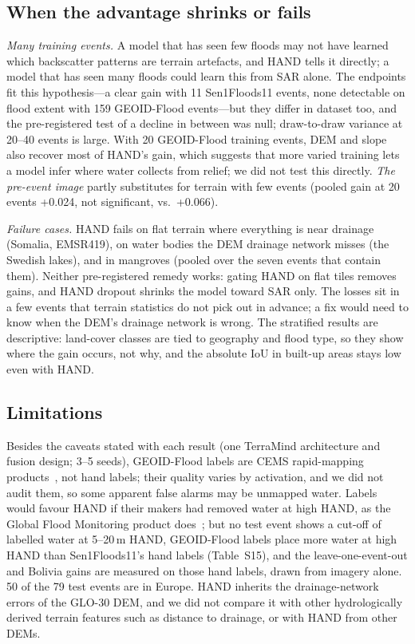 \subsection{When the advantage shrinks or fails}
\emph{Many training events.} A model that has seen few floods may not have learned which backscatter
patterns are terrain artefacts, and HAND tells it directly; a model that has seen many floods could learn
this from SAR alone. The endpoints fit this hypothesis---a clear gain with 11 Sen1Floods11 events, none
detectable on flood extent with 159 GEOID-Flood events---but they differ in dataset too, and the
pre-registered test of a decline in between was null; draw-to-draw variance at 20--40 events is large. With
20 GEOID-Flood training events, DEM and slope also recover most of HAND's gain, which suggests that more
varied training lets a model infer where water collects from relief; we did not test this directly.
\emph{The pre-event image} partly substitutes for terrain with few events (pooled gain at 20 events +0.024, not significant, vs.\ +0.066).

\emph{Failure cases.} HAND fails on flat terrain where everything is near drainage (Somalia, EMSR419), on
water bodies the DEM drainage network misses (the Swedish lakes), and in mangroves (pooled over the seven
events that contain them). Neither pre-registered remedy works: gating HAND on flat tiles removes gains, and HAND dropout
shrinks the model toward SAR only. The losses sit in a few events that terrain statistics do not pick out
in advance; a fix would need to know when the DEM's drainage network is wrong. The stratified results are
descriptive: land-cover classes are tied to geography and flood type, so they show where the gain occurs,
not why, and the absolute IoU in built-up areas stays low even with HAND.


\subsection{Limitations}
Besides the caveats stated with each result (one TerraMind architecture and fusion design; 3--5 seeds),
GEOID-Flood labels are CEMS rapid-mapping products~\cite{joubertboitat2020cemsrm}, not hand labels; their quality varies by
activation, and we did not audit them, so some apparent false alarms may be unmapped water. Labels would
favour HAND if their makers had removed water at high HAND, as the Global Flood Monitoring product
does~\cite{gfm2025pdd,twele2016sentinel1}; but no test event shows a cut-off of labelled water at 5--20\,m
HAND, GEOID-Flood labels place more water at high HAND than Sen1Floods11's hand labels (Table~S15), and the
leave-one-event-out and Bolivia gains are measured on those hand labels, drawn from imagery alone. 50 of the 79
test events are in Europe. HAND inherits the drainage-network errors of the GLO-30 DEM, and we did not compare it with other
hydrologically derived terrain features such as distance to drainage, or with HAND from other DEMs.
